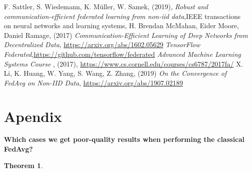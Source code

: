 \documentclass{article}
\theoremstyle{theorem}
\newtheorem{theorem}{Theorem}
\theoremstyle{definition}
\begin{document}
\begin{thebibliography}{5}
	F. Sattler, S. Wiedemann, K. Müller, W. Samek,  (2019), \textit{Robust and communication-efficient federated learning from non-iid data},IEEE transactions on neural networks and learning systems,
	H. Brendan McMahan, Eider Moore, Daniel Ramage, (2017)  \textit{Communication-Efficient Learning of Deep Networks
		from Decentralized Data}, \href{https://arxiv.org/abs/1602.05629}{https://arxiv.org/abs/1602.05629}  
	\textit{TensorFlow Federated},\href{ https://github.com/tensorflow/federated }{https://github.com/tensorflow/federated}
	\textit{Advanced Machine Learning Systems Course} , (2017),  \href{https://www.cs.cornell.edu/courses/cs6787/2017fa/}{https://www.cs.cornell.edu/courses/cs6787/2017fa/}  	
	X. Li, K. Huang, W. Yang, S. Wang, Z. Zhang, (2019)  \textit{On the Convergence of FedAvg on Non-IID Data}, \href{https://arxiv.org/abs/1907.02189}{https://arxiv.org/abs/1907.02189}	
\end{thebibliography}

	\section*{Apendix}
\textbf{Which cases we get poor-quality results when performing the classical FedAvg?} \\
\begin{theorem}
	
\end{theorem}
\end{document}
